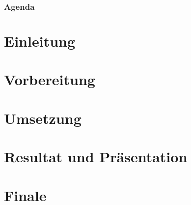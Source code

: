 \documentclass[hyperref={bookmarks=false},aspectratio=169]{beamer}
\begin{document}
\frame{\titlepage}  %

\begin{frame}
\frametitle{Agenda}
\tableofcontents
\end{frame}

\section{Einleitung}
	
	


\section{Vorbereitung}
	
	
	
	

\section{Umsetzung}
	
	
	
	
	
	


\section{Resultat und Präsentation}
	
	
	


\section{Finale}
	
	
\end{document}

